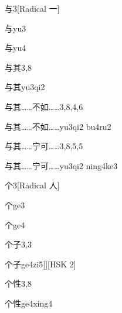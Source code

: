 \begin{entry}{与}{3}[Radical 一]
  \begin{phonetics}{与}{yu3}
  \end{phonetics}
  \begin{phonetics}{与}{yu4}
  \end{phonetics}
\end{entry}

\begin{entry}{与其}{3,8}
  \begin{phonetics}{与其}{yu3qi2}
  \end{phonetics}
\end{entry}

\begin{entry}{与其……不如……}{3,8,4,6}
  \begin{phonetics}{与其……不如……}{yu3qi2 bu4ru2}
  \end{phonetics}
\end{entry}

\begin{entry}{与其……宁可……}{3,8,5,5}
  \begin{phonetics}{与其……宁可……}{yu3qi2 ning4ke3}
  \end{phonetics}
\end{entry}

\begin{entry}{个}{3}[Radical 人]
  \begin{phonetics}{个}{ge3}
  \end{phonetics}
  \begin{phonetics}{个}{ge4}
  \end{phonetics}
\end{entry}

\begin{entry}{个子}{3,3}
  \begin{phonetics}{个子}{ge4zi5}[][HSK 2]
  \end{phonetics}
\end{entry}

\begin{entry}{个性}{3,8}
  \begin{phonetics}{个性}{ge4xing4}
  \end{phonetics}
\end{entry}

